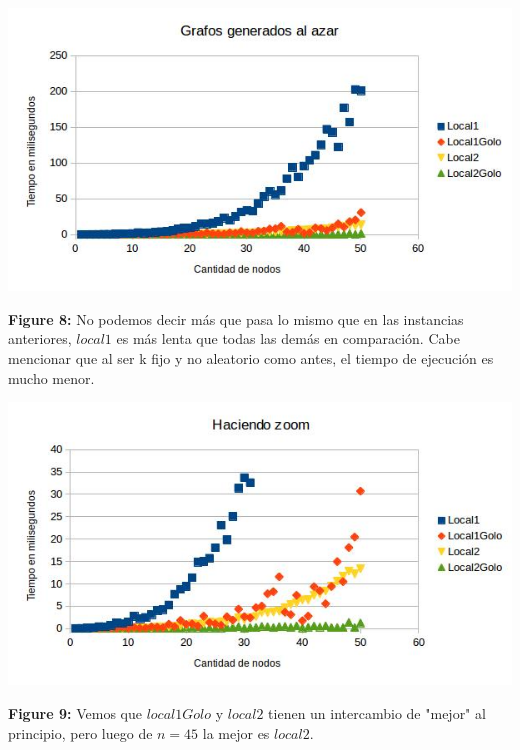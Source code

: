 \documentclass[a4paper]{article}
\begin{document}
\includegraphics[width=\textwidth,height=\textheight,keepaspectratio
]{k3n1-50.jpg}
\begin {flushleft}
\textbf{Figure 8:} No podemos decir más que pasa lo mismo que en las instancias anteriores, $local1$ es más lenta que todas las demás en comparación. Cabe mencionar que al ser k fijo y no aleatorio como antes, el tiempo de ejecución es mucho menor.
\end{flushleft}

\includegraphics[width=\textwidth,height=\textheight,keepaspectratio
]{k3n1-50Zoom.jpg}
\begin {flushleft}
\textbf{Figure 9:} Vemos que $local1Golo$ y $local2$ tienen un intercambio de "mejor" al principio, pero luego de $n=45$ la mejor es $local2$.
\end{flushleft}
\end{document}
